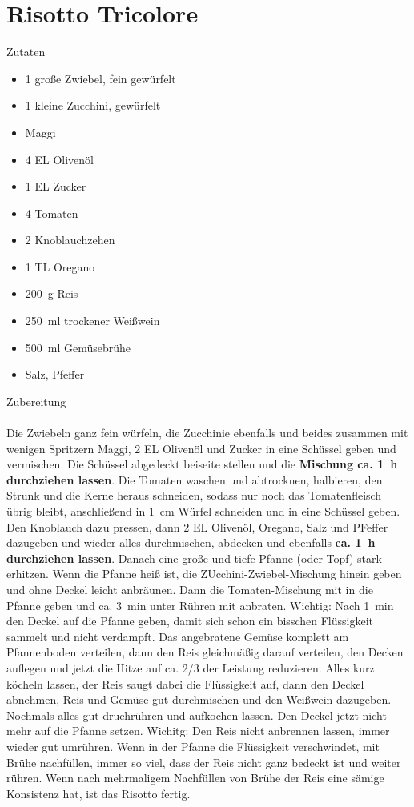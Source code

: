 \section*{Risotto Tricolore}
\ihead{}\ohead{}
\cfoot{}
{\Large Zutaten}
\begin{multicols}{2}
\begin{itemize}
    \item \num{1} große Zwiebel, fein gewürfelt
    \item \num{1} kleine Zucchini, gewürfelt
    \item Maggi
    \item \num{4} EL Olivenöl
    \item \num{1} EL Zucker
    \item \num{4} Tomaten
    \item \num{2} Knoblauchzehen
    \item \num{1} TL Oregano
    \item \SI{200}{g} Reis
    \item \SI{250}{ml} trockener Weißwein
    \item \SI{500}{ml} Gemüsebrühe
    \item Salz, Pfeffer
\end{itemize}
\end{multicols}
\noindent
{\Large Zubereitung}\\
\\
Die Zwiebeln ganz fein würfeln, die Zucchinie ebenfalls und beides zusammen mit wenigen Spritzern Maggi, \num{2} EL Olivenöl und Zucker in eine Schüssel geben und vermischen.
Die Schüssel abgedeckt beiseite stellen und die \textbf{Mischung ca. \SI{1}{h} durchziehen lassen}.
Die Tomaten waschen und abtrocknen, halbieren, den Strunk und die Kerne heraus schneiden, sodass nur noch das Tomatenfleisch übrig bleibt, anschließend in \SI{1}{cm} Würfel schneiden und in eine Schüssel geben. 
Den Knoblauch dazu pressen, dann \num{2} EL Olivenöl, Oregano, Salz und PFeffer dazugeben und wieder alles durchmischen, abdecken und ebenfalls \textbf{ca. \SI{1}{h} durchziehen lassen}.
Danach eine große und tiefe Pfanne (oder Topf) stark erhitzen.
Wenn die Pfanne heiß ist, die ZUcchini-Zwiebel-Mischung hinein geben und ohne Deckel leicht anbräunen.
Dann die Tomaten-Mischung mit in die Pfanne geben und ca. \SI{3}{min} unter Rühren mit anbraten.
Wichtig: Nach \SI{1}{min} den Deckel auf die Pfanne geben, damit sich schon ein bisschen Flüssigkeit sammelt und nicht verdampft.
Das angebratene Gemüse komplett am Pfannenboden verteilen, dann den Reis gleichmäßig darauf verteilen, den Decken auflegen und jetzt die Hitze auf ca. \num{2/3} der Leistung reduzieren.
Alles kurz köcheln lassen, der Reis saugt dabei die Flüssigkeit auf, dann den Deckel abnehmen, Reis und Gemüse gut durchmischen und den Weißwein dazugeben.
Nochmals alles gut druchrühren und aufkochen lassen.
Den Deckel jetzt nicht mehr auf die Pfanne setzen.
Wichitg: Den Reis nicht anbrennen lassen, immer wieder gut umrühren.
Wenn in der Pfanne die Flüssigkeit verschwindet, mit Brühe nachfüllen, immer so viel, dass der Reis nicht ganz bedeckt ist und weiter rühren.
Wenn nach mehrmaligem Nachfüllen von Brühe der Reis eine sämige Konsistenz hat, ist das Risotto fertig.
